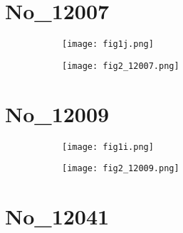 \documentclass[%
 reprint,
 amsmath,amssymb,
 aps,
]{revtex4-2}
\begin{document}
\section{No_12007}

\begin{figure}[b]

\centering

\quad
    \begin{subfigure}[b]{0.45\textwidth}
    \centering
    \texttt{[image: fig1j.png]}
    \caption{\label{fig:fig1j.png}}
    \end{subfigure}
\quad
    \begin{subfigure}[b]{0.45\textwidth}
    \centering
    \texttt{[image: fig2\_12007.png]}
    \caption{\label{fig:fig2_12007.png}}
    \end{subfigure}


\captionsetup{justification=raggedright,singlelinecheck=false}
\caption{\label{fig:fig1j.png}}

\end{figure}



\section{No_12009}

\begin{figure}[b]

\centering

\quad
    \begin{subfigure}[b]{0.45\textwidth}
    \centering
    \texttt{[image: fig1i.png]}
    \caption{\label{fig:fig1i.png}}
    \end{subfigure}
\quad
    \begin{subfigure}[b]{0.45\textwidth}
    \centering
    \texttt{[image: fig2\_12009.png]}
    \caption{\label{fig:fig2_12009.png}}
    \end{subfigure}


\captionsetup{justification=raggedright,singlelinecheck=false}
\caption{\label{fig:fig1i.png}}

\end{figure}



\section{No_12041}
\end{document}
